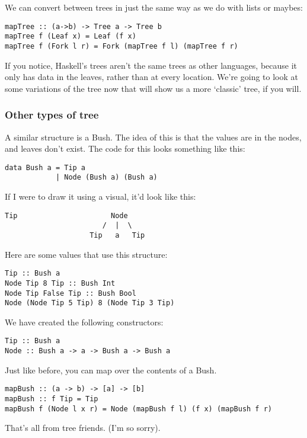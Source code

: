 \documentclass[11pt,a4paper,titlepage]{scrartcl}
\begin{document}
We can convert between trees in just the same way as we do with lists or
maybes:

\begin{lstlisting}
mapTree :: (a->b) -> Tree a -> Tree b
mapTree f (Leaf x) = Leaf (f x)
mapTree f (Fork l r) = Fork (mapTree f l) (mapTree f r)
\end{lstlisting}

If you notice, Haskell's trees aren't the same trees as other languages,
because it only has data in the leaves, rather than at every location.
We're going to look at some variations of the tree now that will show us a
more `classic' tree, if you will.

\subsubsection{Other types of tree}%
\label{ssub:trees1}
A similar structure is a Bush. The idea of this is that the values are in
the nodes, and leaves don't exist. The code for this looks something like
this:
\begin{lstlisting}
data Bush a = Tip a
            | Node (Bush a) (Bush a)
\end{lstlisting}

If I were to draw it using a visual, it'd look like this:
\begin{lstlisting}
Tip                      Node
                       /  |  \
                    Tip   a   Tip
\end{lstlisting}

Here are some values that use this structure:
\begin{lstlisting}
Tip :: Bush a
Node Tip 8 Tip :: Bush Int
Node Tip False Tip :: Bush Bool
Node (Node Tip 5 Tip) 8 (Node Tip 3 Tip)
\end{lstlisting}

We have created the following constructors:
\begin{lstlisting}
Tip :: Bush a
Node :: Bush a -> a -> Bush a -> Bush a
\end{lstlisting}

Just like before, you can map over the contents of a Bush.

\begin{lstlisting}
mapBush :: (a -> b) -> [a] -> [b]
mapBush :: f Tip = Tip
mapBush f (Node l x r) = Node (mapBush f l) (f x) (mapBush f r)
\end{lstlisting}

That's all from tree friends. (I'm so sorry).
\end{document}

